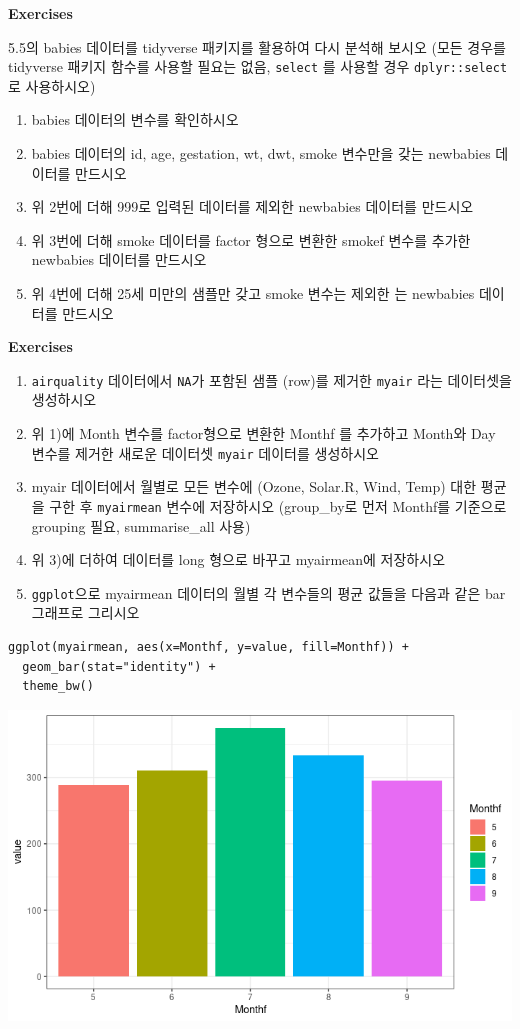 \documentclass[
]{book}
\begin{document}
\textbf{Exercises}

5.5의 babies 데이터를 tidyverse 패키지를 활용하여 다시 분석해 보시오 (모든 경우를 tidyverse 패키지 함수를 사용할 필요는 없음, \texttt{select} 를 사용할 경우 \texttt{dplyr::select} 로 사용하시오)

\begin{enumerate}
\def\labelenumi{\arabic{enumi})}
\item
  babies 데이터의 변수를 확인하시오
\item
  babies 데이터의 id, age, gestation, wt, dwt, smoke 변수만을 갖는 newbabies 데이터를 만드시오
\item
  위 2번에 더해 999로 입력된 데이터를 제외한 newbabies 데이터를 만드시오
\item
  위 3번에 더해 smoke 데이터를 factor 형으로 변환한 smokef 변수를 추가한 newbabies 데이터를 만드시오
\item
  위 4번에 더해 25세 미만의 샘플만 갖고 smoke 변수는 제외한 는 newbabies 데이터를 만드시오
\end{enumerate}

\textbf{Exercises}

\begin{enumerate}
\def\labelenumi{\arabic{enumi}.}
\item
  \texttt{airquality} 데이터에서 \texttt{NA}가 포함된 샘플 (row)를 제거한 \texttt{myair} 라는 데이터셋을 생성하시오
\item
  위 1)에 Month 변수를 factor형으로 변환한 Monthf 를 추가하고 Month와 Day 변수를 제거한 새로운 데이터셋 \texttt{myair} 데이터를 생성하시오
\item
  myair 데이터에서 월별로 모든 변수에 (Ozone, Solar.R, Wind, Temp) 대한 평균을 구한 후 \texttt{myairmean} 변수에 저장하시오 (group\_by로 먼저 Monthf를 기준으로 grouping 필요, summarise\_all 사용)
\item
  위 3)에 더하여 데이터를 long 형으로 바꾸고 myairmean에 저장하시오
\item
  \texttt{ggplot}으로 myairmean 데이터의 월별 각 변수들의 평균 값들을 다음과 같은 bar 그래프로 그리시오
\end{enumerate}

\begin{verbatim}
ggplot(myairmean, aes(x=Monthf, y=value, fill=Monthf)) +
  geom_bar(stat="identity") +
  theme_bw()
\end{verbatim}

\includegraphics{images/08/00002e.png}
\end{document}
